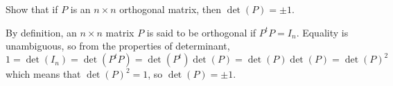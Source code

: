 \documentclass{ximera}
\author{Matthew Carr}
\begin{document}

\begin{exercise}\label{mc.exercise10}

Show that if $P$ is an $n\times n$ orthogonal matrix, then $\det(P) = \pm 1$.
  
\begin{solution}


\soln By definition, an $n\times n$ matrix $P$ is said to be orthogonal if $P^t P=I_n$. Equality is unambiguous, so from the properties of determinant, 
\[
1=\det(I_n)=\det(P^t P)=\det(P^t)\det(P)=\det(P)\det(P)=\det(P)^2
\]
which means that $\det(P)^2=1$, so $\det(P)=\pm 1$. 
\end{solution}
\end{exercise}
\end{document}
